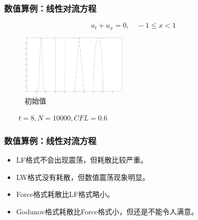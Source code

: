 \documentclass[8pt,mathserif]{beamer}
\begin{document}
\begin{frame}
  \frametitle{数值算例：线性对流方程} 
    \begin{equation*}
      u_t+u_x = 0 , \quad -1\leq x < 1
    \end{equation*}
    \begin{figure}[H]
        \includegraphics[width=0.45\textwidth]{../doc/images/advection_t0.eps}
      \caption{初始值}
    \end{figure}
\end{frame}
\begin{frame}
  $\qquad t=8, N=10000, CFL=0.6$
  \frametitle{数值算例：线性对流方程}
  \begin{figure}[H]
  \end{figure}
  \begin{itemize}
    \item LF格式不会出现震荡，但耗散比较严重。
    \item LW格式没有耗散，但数值震荡现象明显。
    \item Force格式耗散比LF格式略小。
    \item Godunov格式耗散比Force格式小，但还是不能令人满意。
  \end{itemize}
\end{frame}
\end{document}
